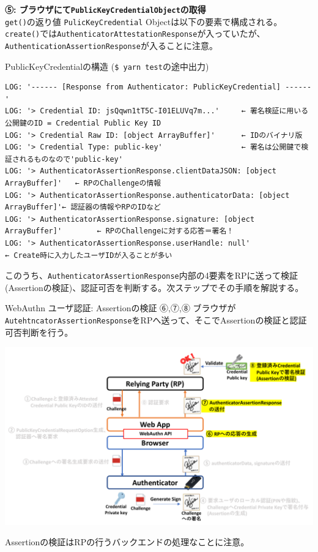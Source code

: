 \documentclass[12pt,dvipdfmx,uplatex]{beamer}
\begin{document}
\begin{frame}[fragile]
\small
\textbf{⑤: ブラウザにて\texttt{PublicKeyCredentialObject}の取得}\\[2ex]

\texttt{get()}の返り値 \texttt{PulicKeyCredential} Objectは以下の要素で構成される。\texttt{create()}では\texttt{AuthenticatorAttestationResponse}が入っていたが、\alert{\texttt{AuthenticationAssertionResponse}が入ることに注意。}

\begin{exampleblock}{\footnotesize PublicKeyCredentialの構造 (\texttt{\$ yarn test}の途中出力)}
\tiny
\begin{verbatim}
LOG: '------ [Response from Authenticator: PublicKeyCredential] ------'
LOG: '> Credential ID: jsQqwn1tT5C-I01ELUVq7m...'     ← 署名検証に用いる公開鍵のID = Credential Public Key ID
LOG: '> Credential Raw ID: [object ArrayBuffer]'      ← IDのバイナリ版
LOG: '> Credential Type: public-key'                  ← 署名は公開鍵で検証されるものなので'public-key'
LOG: '> AuthenticatorAssertionResponse.clientDataJSON: [object ArrayBuffer]'   ← RPのChallengeの情報
LOG: '> AuthenticatorAssertionResponse.authenticatorData: [object ArrayBuffer]'← 認証器の情報やRPのIDなど
LOG: '> AuthenticatorAssertionResponse.signature: [object ArrayBuffer]'        ← RPのChallengeに対する応答＝署名！
LOG: '> AuthenticatorAssertionResponse.userHandle: null'                       ← Create時に入力したユーザIDが入ることが多い
\end{verbatim}
\end{exampleblock}

このうち、\texttt{AuthenticatorAssertionResponse}内部の4要素をRPに送って検証 (Assertionの検証)、認証可否を判断する。次ステップでその手順を解説する。
\end{frame}



\begin{frame}{WebAuthn ユーザ認証: Assertionの検証}
\small
⑥,⑦,⑧ ブラウザが\texttt{AutehtncatorAssertionResponse}をRPへ送って、そこでAssertionの検証と認証可否判断を行う。
\begin{center}
\includegraphics[width=0.9\linewidth]{Figs/webauthn-authentication4.pdf}
\end{center}
\alert{Assertionの検証はRPの行うバックエンドの処理なことに注意。}
\end{frame}
\end{document}
